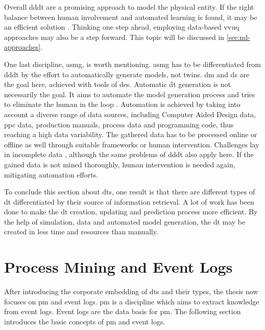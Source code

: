 Overall \gls{dddt} are a promising approach to model the physical entity. If the right balance between human involvement and automated learning is found, it may be an efficient solution \autocite{francis2021towards}. Thinking one step ahead, employing data-based \gls{vvuq} approaches may also be a step forward. This topic will be discussed in \autoref{sec:ml-approaches}.

\label{par:asmg}
One last discipline, \gls{asmg}, is worth mentioning. \gls{asmg} has to be differentiated from \gls{dddt} by the effort to automatically generate models, not twins. \gls{dm} and \gls{ds} are the goal here, achieved with tools of \gls{des}. Automatic \gls{dt} generation is not necessarily the goal. It aims to automate the model generation process and tries to eliminate the human in the loop \autocite{reinhardt2019survey,lechevalier2018methodology}. Automation is achieved by taking into account a diverse range of data sources, including Computer Aided Design data, \gls{ppc} data, production manuals, process data and programming code, thus reaching a high data variability. The gathered data has to be processed online or offline as well through suitable frameworks or human intervention. Challenges lay in incomplete data \autocite{bergmann2014automatische}, although the same problems of \gls{dddt} also apply here. If the gained data is not mined thoroughly, human intervention is needed again, mitigating automation efforts.

To conclude this section about \gls{dt}s, one result is that there are different types of \gls{dt} differentiated by their source of information retrieval. A lot of work has been done to make the \gls{dt} creation, updating and prediction process more efficient. By the help of simulation, data and automated model generation, the \gls{dt} may be created in less time and resources than manually.

\section{Process Mining and Event Logs}
\label{sec:process-mining}
After introducing the corporate embedding of \gls{dt}s and their types, the thesis now focuses on \gls{pm} and event logs. \gls{pm} is a discipline which aims to extract knowledge from event logs. Event logs are the data basis for \gls{pm}. The following section introduces the basic concepts of \gls{pm} and event logs.

